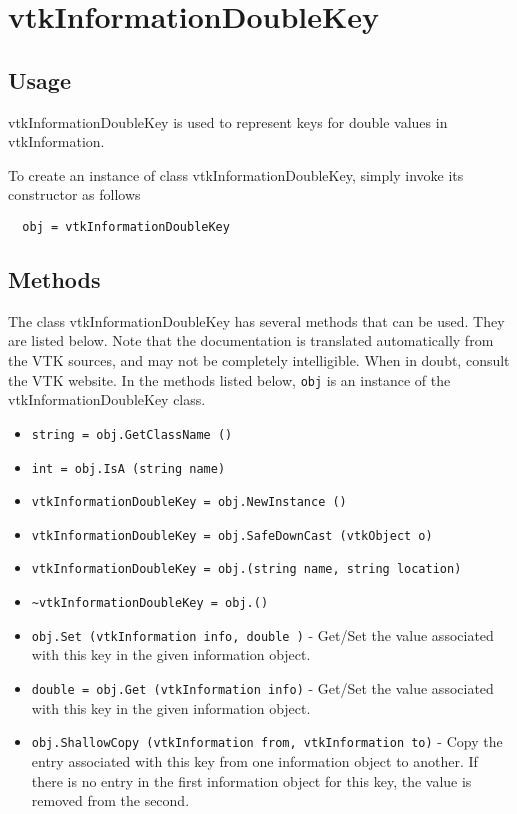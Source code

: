 \section{vtkInformationDoubleKey}

\subsection{Usage}

 vtkInformationDoubleKey is used to represent keys for double values
 in vtkInformation.

To create an instance of class vtkInformationDoubleKey, simply
invoke its constructor as follows
\begin{verbatim}
  obj = vtkInformationDoubleKey
\end{verbatim}
\subsection{Methods}

The class vtkInformationDoubleKey has several methods that can be used.
  They are listed below.
Note that the documentation is translated automatically from the VTK sources,
and may not be completely intelligible.  When in doubt, consult the VTK website.
In the methods listed below, \verb|obj| is an instance of the vtkInformationDoubleKey class.
\begin{itemize}
\item  \verb|string = obj.GetClassName ()|

\item  \verb|int = obj.IsA (string name)|

\item  \verb|vtkInformationDoubleKey = obj.NewInstance ()|

\item  \verb|vtkInformationDoubleKey = obj.SafeDownCast (vtkObject o)|

\item  \verb|vtkInformationDoubleKey = obj.(string name, string location)|

\item  \verb|~vtkInformationDoubleKey = obj.()|

\item  \verb|obj.Set (vtkInformation info, double )| -  Get/Set the value associated with this key in the given
 information object.

\item  \verb|double = obj.Get (vtkInformation info)| -  Get/Set the value associated with this key in the given
 information object.

\item  \verb|obj.ShallowCopy (vtkInformation from, vtkInformation to)| -  Copy the entry associated with this key from one information
 object to another.  If there is no entry in the first information
 object for this key, the value is removed from the second.

\end{itemize}
